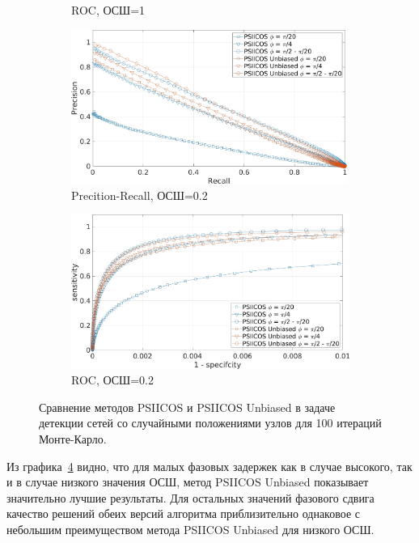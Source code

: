 \begin{figure}[htbp]
\begin{subfigure}[t]{0.5\textwidth}
        \caption{ROC, ОСШ=1}\label{fig:psiicos_vs_unbiased_monte_b}
    \end{subfigure}
    \hspace{-2cm}
    \begin{subfigure}[t]{0.5\textwidth}
        \includegraphics[width=0.99\textwidth]{../images/pre_rec_snr_02.jpg}
        \caption{Precition-Recall, ОСШ=0.2}\label{fig:psiicos_vs_unbiased_monte_c}
    \end{subfigure}
    \begin{subfigure}[t]{0.5\textwidth}
        \includegraphics[width=0.99\linewidth]{../images/roc_snr_02.jpg}
        \caption{ROC, ОСШ=0.2}\label{fig:psiicos_vs_unbiased_monte_d}
    \end{subfigure}
    \caption{Сравнение методов PSIICOS и PSIICOS Unbiased в задаче детекции сетей со случайными
    положениями узлов для 100 итераций Монте-Карло.}\label{fig:psiicos_vs_unbiased_monte}
\end{figure}

Из графика~\ref{fig:psiicos_vs_unbiased_monte} видно, что для малых фазовых задержек
как в случае высокого, так и в случае низкого значения ОСШ, метод PSIICOS Unbiased
показывает значительно лучшие результаты. Для остальных значений фазового сдвига
качество решений обеих версий алгоритма приблизительно однаковое с небольшим
преимуществом метода PSIICOS Unbiased для низкого ОСШ.

